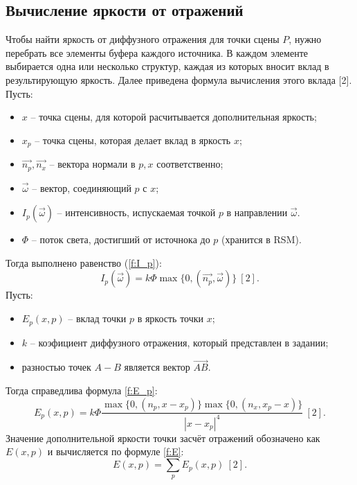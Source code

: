 {{        \subsection{Вычисление яркости от отражений} {
            Чтобы найти яркость от диффузного отражения для точки сцены $P$,
            нужно перебрать все элементы буфера каждого источника.
            В каждом элементе выбирается одна или несколько структур,
            каждая из которых вносит вклад в результирующую яркость.
            Далее приведена формула вычисления этого вклада [2]. \\
            Пусть:
            \begin{itemize}
                \item $x$ -- точка сцены, для которой расчитывается дополнительная яркость;
                \item $x_p$ -- точка сцены, которая делает вклад в яркость $x$;
                \item $\vec{n_p}, \vec{n_x}$ -- вектора нормали в $p, x$ соответственно;
                \item $\vec{\omega}$ -- вектор, соединяющий $p$ с $x$;
                \item $I_p(\vec{\omega})$ -- интенсивность, испускаемая точкой $p$ в
                направлении $\vec{\omega}$.
                \item $\Phi$ -- поток света, достигший от источнока до $p$ (хранится в RSM).
            \end{itemize}
            Тогда выполнено равенство (\ref{f:I_p}):
            \begin{equation}
                \label{f:I_p}
                I_p(\vec{\omega}) = k\Phi \operatorname{max}\{0, (\vec{n_p}, \vec{\omega})\}~[2].
            \end{equation}
            Пусть:
            \begin{itemize}
                \item $E_p(x, p)$ -- вклад точки $p$ в яркость точки $x$;
                \item
                    $k$ -- коэфициент диффузного отражения,
                    который представлен в задании;
                \item разностью точек $A - B$ является вектор $\vec{AB}$.
            \end{itemize}
            Тогда справедлива формула \ref{f:E_p}:
            \begin{equation}
                \label{f:E_p}
                E_p(x, p) = k\Phi\frac{ \operatorname{max}\{0, (n_p, x - x_p)\}
                \operatorname{max}\{0, (n_x, x_p - x)\} }
                {|x - x_p|^4}~[2].
            \end{equation}
            Значение дополнительной яркости точки засчёт отражений
            обозначено как $E(x, p)$ и вычисляется по формуле \ref{f:E}:
            \begin{equation}
                \label{f:E}
                E(x, p) = \sum_p E_p(x, p)~[2].
            \end{equation}
        }
}}
